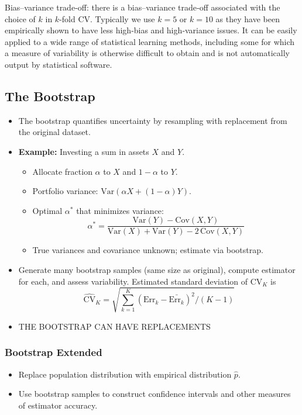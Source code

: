 \documentclass{article}
\begin{document}
Bias–variance trade‐off: there is a bias–variance trade‐off associated with the choice of \(k\) in \(k\)-fold CV. Typically we use \(k=5\) or \(k=10\) as they have been empirically shown to have less high‐bias and high‐variance issues. It can be easily applied to a wide range of statistical learning methods, including some for which a measure of variability is otherwise difficult to obtain and is not automatically output by statistical software.









\subsection{The Bootstrap}
\begin{itemize}
    \item The bootstrap quantifies uncertainty by resampling with replacement from the original dataset.
    \item \textbf{Example:} Investing a sum in assets $X$ and $Y$.
    \begin{itemize}
        \item Allocate fraction $\alpha$ to $X$ and $1-\alpha$ to $Y$.
        \item Portfolio variance: $\mathrm{Var}(\alpha X + (1-\alpha)Y)$.
        \item Optimal $\alpha^*$ that minimizes variance:
        \[
            \alpha^* = \frac{\mathrm{Var}(Y) - \mathrm{Cov}(X,Y)}{\mathrm{Var}(X) + \mathrm{Var}(Y) - 2\,\mathrm{Cov}(X,Y)}
        \]
        \item True variances and covariance unknown; estimate via bootstrap.
    \end{itemize}
    \item Generate many bootstrap samples (same size as original), compute estimator for each, and assess variability.
    Estimated standard deviation of CV$_K$ is 
    \begin{equation*}
        \hat{\mathrm{CV}}_K = \sqrt{\sum_{k=1}^K (\mathrm{Err}_k - \bar{\mathrm{Err}_k})^2 / (K-1)}
    \end{equation*}
    \item THE BOOTSTRAP CAN HAVE REPLACEMENTS
\end{itemize}

\subsubsection{Bootstrap Extended}
\begin{itemize}
    \item Replace population distribution with empirical distribution $\hat{p}$.
    \item Use bootstrap samples to construct confidence intervals and other measures of estimator accuracy.
\end{itemize}
\end{document}
